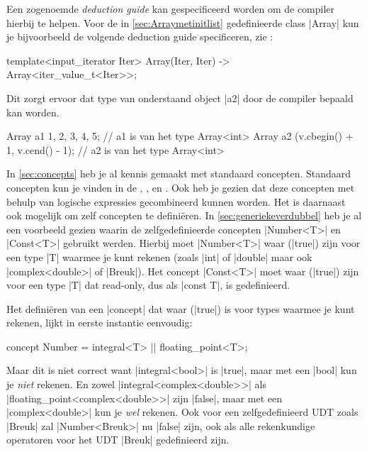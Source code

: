 \begin{cpplstShortInline}
Een zogenoemde \emph{deduction guide} kan gespecificeerd worden om de compiler hierbij te helpen.
Voor de in \cref{sec:Arraymetinitlist} gedefinieerde class |Array| kun je bijvoorbeeld de volgende deduction guide specificeren, zie :
\begin{cpplstfragment}
template<input_iterator Iter> Array(Iter, Iter) -> Array<iter_value_t<Iter>>;
\end{cpplstfragment}
Dit zorgt ervoor dat type van onderstaand object |a2| door de compiler bepaald kan worden.
\begin{cpplstfragment}
	Array a1 {1, 2, 3, 4, 5}; // a1 is van het type Array<int> 
	Array a2 (v.cbegin() + 1, v.cend() - 1); // a2 is van het type Array<int>
\end{cpplstfragment}

\label{sec:defineconcepts}
In \cref{sec:concepts} heb je al kennis gemaakt met standaard concepten.
Standaard concepten kun je vinden in de , ,  en . 
Ook heb je gezien dat deze concepten met behulp van logische expressies gecombineerd kunnen worden.
Het is daarnaast ook mogelijk om zelf concepten te definiëren.
In \cref{sec:generiekeverdubbel} heb je al een voorbeeld gezien waarin de zelfgedefinieerde concepten |Number<T>| en |Const<T>| gebruikt werden.
Hierbij moet |Number<T>| waar (|true|) zijn voor een type |T| waarmee je kunt rekenen (zoals |int| of |double| maar ook |complex<double>| of |Breuk|).
Het concept |Const<T>| moet waar (|true|) zijn voor een type |T| dat read-only, dus als |const T|, is gedefinieerd.

Het definiëren van een |concept| dat waar (|true|) is voor types waarmee je kunt rekenen, lijkt in eerste instantie eenvoudig:
\begin{cpplstfragment}
concept Number = integral<T> || floating_point<T>;
\end{cpplstfragment}
Maar dit is niet correct want |integral<bool>| is |true|, maar met een |bool| kun je \emph{niet} rekenen.
En zowel |integral<complex<double>>| als |floating_point<complex<double>>| zijn |false|, maar met een |complex<double>| kun je \emph{wel} rekenen.
Ook voor een zelfgedefinieerd UDT zoals |Breuk| zal |Number<Breuk>| nu |false| zijn, ook als alle rekenkundige operatoren voor het UDT |Breuk| gedefinieerd zijn.


\end{cpplstShortInline}
